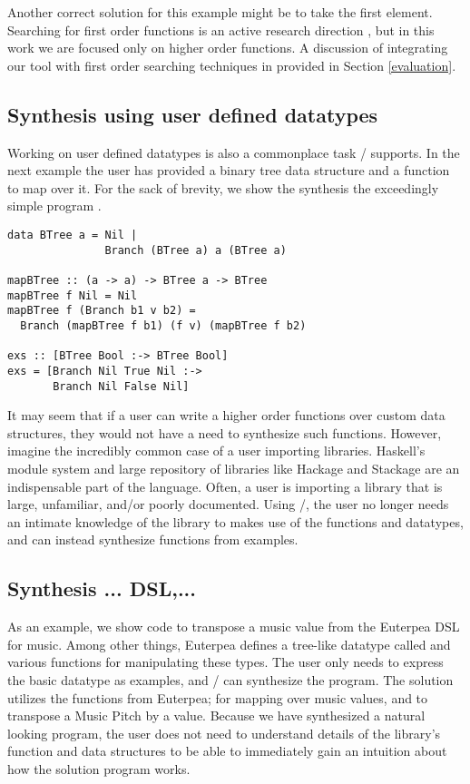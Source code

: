 Another correct solution for this example might be  to take the first element. Searching for first order functions is an active research direction \cite{Osera:2015, Osera:2016, Feser:2015}, but in this work we are focused only on higher order functions. A discussion of integrating our tool with first order searching techniques in provided in Section \ref{evaluation}.

\subsection{Synthesis using user defined datatypes}

Working on user defined datatypes is also a commonplace task \ourTool/ supports. In the next example the user has provided a binary tree data structure and a function to map over it. For the sack of brevity, we show the synthesis the exceedingly simple program .



\begin{lstlisting}
data BTree a = Nil |
               Branch (BTree a) a (BTree a)

mapBTree :: (a -> a) -> BTree a -> BTree 
mapBTree f Nil = Nil
mapBTree f (Branch b1 v b2) = 
  Branch (mapBTree f b1) (f v) (mapBTree f b2)

exs :: [BTree Bool :-> BTree Bool]
exs = [Branch Nil True Nil :->
       Branch Nil False Nil]
\end{lstlisting}

It may seem that if a user can write a higher order functions over custom data structures, they would not have a need to synthesize such functions.
However, imagine the incredibly common case of a user importing libraries.
Haskell's module system and large repository of libraries like Hackage and Stackage are an indispensable part of the language\cite{hackage,stackage}.
Often, a user is importing a library that is large, unfamiliar, and/or poorly documented.
Using \ourTool/, the user no longer needs an intimate knowledge of the library to makes use of the functions and datatypes, and can instead synthesize functions from examples.


\subsection{Synthesis ... DSL,...}

As an example, we show code to transpose a music value from the Euterpea DSL for music\cite{euterpea}.
Among other things, Euterpea defines a tree-like datatype called  and various functions for manipulating these types.
The user only needs to express the basic datatype as examples, and \ourTool/ can synthesize the  program.
The solution utilizes the functions from Euterpea;  for mapping over music values, and  to transpose a Music Pitch by a value.
Because we have synthesized a natural looking program, the user does not need to understand details of the library's function and data structures to be able to immediately gain an intuition about how the solution program works.

